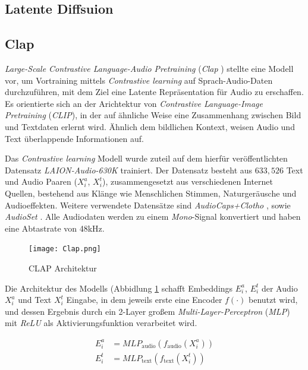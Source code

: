 \documentclass[
  a4paper,  %
  twoside,  %
  bibliography=totoc,
  headsepline,
  cleardoublepage=empty,
  parskip=half,
  draft=false
]{scrbook}
\begin{document}
\subsection{Latente Diffsuion}

\newpage
\subsection{Clap}

\emph{Large-Scale Contrastive Language-Audio Pretraining} (\emph{Clap} )\cite{wu_large-scale_2023} stellte eine Modell vor, um Vortraining mittels \emph{Contrastive learning} auf Sprach-Audio-Daten durchzuführen, mit dem Ziel eine Latente Repräsentation für Audio zu erschaffen. Es orientierte sich an der Arichtektur von \emph{Contrastive Language-Image Pretraining} (\emph{CLIP})\cite{radford_learning_2021}, in der auf ähnliche Weise eine Zusammenhang zwischen Bild und Textdaten erlernt wird. Ähnlich dem  bildlichen Kontext, weisen Audio und Text überlappende Informationen auf. 

Das \emph{Contrastive learning} Modell wurde zuteil auf dem hierfür veröffentlichten Datensatz \emph{\emph{LAION-Audio-630K}} trainiert. Der Datensatz besteht aus $633,526$ Text und Audio Paaren ($X_i^a$, $X_i^t$), zusammengesetzt aus verschiedenen Internet Quellen, bestehend aus Klänge wie Menschlichen Stimmen, Naturgeräusche und Audioeffekten. Weitere verwendete Datensätze sind \emph{AudioCaps+Clotho} \cite{kim_audiocaps_2019} \cite{drossos_clotho_2019} , sowie \emph{AudioSet} \cite{gemmeke_audio_2017}. Alle Audiodaten werden zu einem \emph{Mono}-Signal konvertiert und haben eine Abtastrate von 48kHz. \cite{wu_large-scale_2023}

\begin{figure}[h]
  \centering
  \texttt{[image: Clap.png]}
  \caption[Clap Architektur]{CLAP Architektur \cite{wu_large-scale_2023}}
  \label{fig:Clap}
\end{figure} 

Die Architektur des Modells (Abbidlung \ref{fig:Clap} schafft Embeddings $E_i^a$, $E_i^t$  der Audio $X_i^a$ und Text $X_i^t$ Eingabe, in dem jeweils erste eine Encoder $f(\cdot)$ benutzt wird, und dessen Ergebnis durch ein 2-Layer großem \emph{Multi-Layer-Perceptron} (\emph{MLP}) mit \emph{ReLU}\cite{agarap_deep_2019} als Aktivierungsfunktion verarbeitet wird. \cite{wu_large-scale_2023}

\begin{align}
  E_i^a & = M L P_{\text{audio}}\left(f_{\text{audio}}\left(X_i^a\right)\right) \\
  E_i^t & = M L P_{\text{text}}\left(f_{\text{text}}\left(X_i^t\right)\right)
\end{align}
\end{document}
